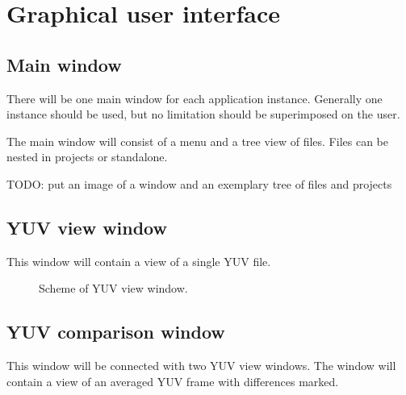 \chapter{Graphical user interface}
\label{chap:GUI}

\section{Main window}

There will be one main window for each application instance. Generally one instance should be used, but no limitation should be superimposed on the user.

The main window will consist of a menu and a tree view of files. Files can be nested in projects or standalone.

TODO: put an image of a window and an exemplary tree of files and projects

\section{YUV view window}

This window will contain a view of a single YUV file.

\begin{figure}[ht]
  \begin{center}
    \def\svgwidth{200pt}
    
    \caption{Scheme of YUV view window.\label{fig:YUV_view_window}}
  \end{center}
\end{figure}

\section{YUV comparison window}

This window will be connected with two YUV view windows. The window will contain a view of an averaged YUV frame with differences marked.
